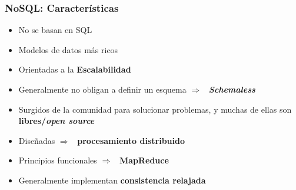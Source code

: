 \documentclass[14pt]{beamer}
\newcommand{\ra}{{\color{blue} $\Rightarrow${}~{}}}
\begin{document}
\begin{frame}[allowframebreaks]
 \frametitle{NoSQL: Características}
\begin{itemize}
\item No se basan en SQL
\item Modelos de datos más ricos
\item Orientadas a la {\bf Escalabilidad}
\item Generalmente no obligan a definir un esquema \ra{}
  {\itshape\bfseries Schemaless}
\item Surgidos de la comunidad para solucionar problemas, y muchas de
  ellas son {\bf libres/{\itshape open source}}
\item Diseñadas \ra{} {\bf procesamiento distribuido}
\item Principios funcionales \ra{} {\bf MapReduce}
\item Generalmente implementan {\bf consistencia relajada}
\end{itemize}


\end{frame}


\end{document}

